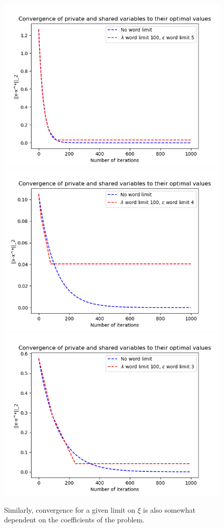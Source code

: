 \documentclass[12pt]{article}
\begin{document}
\begin{figure}[H]
	\centering
	\includegraphics[scale=0.5]{Problem4-Convergence8.png}
	\includegraphics[scale=0.5]{Problem4-Convergence9.png}
	\includegraphics[scale=0.5]{Problem4-Convergence10.png}
	\caption{Similarly, convergence for a given limit on $\xi$ is also somewhat dependent on the coefficients of the problem.}
\end{figure}
\end{document}
